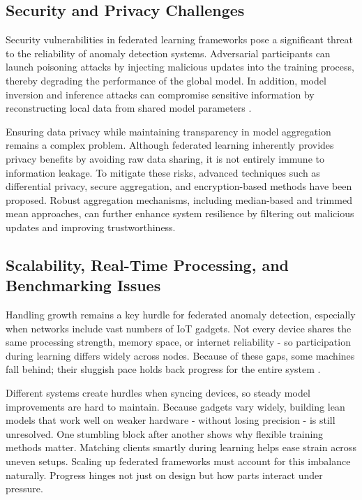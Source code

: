 \documentclass[12pt]{article}
\begin{document}
\subsection{Security and Privacy Challenges}

Security vulnerabilities in federated learning frameworks pose a significant threat to the reliability of anomaly detection systems. Adversarial participants can launch poisoning attacks by injecting malicious updates into the training process, thereby degrading the performance of the global model. In addition, model inversion and inference attacks can compromise sensitive information by reconstructing local data from shared model parameters \cite{paper5,paper6}.

Ensuring data privacy while maintaining transparency in model aggregation remains a complex problem. Although federated learning inherently provides privacy benefits by avoiding raw data sharing, it is not entirely immune to information leakage. To mitigate these risks, advanced techniques such as differential privacy, secure aggregation, and encryption-based methods have been proposed. Robust aggregation mechanisms, including median-based and trimmed mean approaches, can further enhance system resilience by filtering out malicious updates and improving trustworthiness.

\subsection{Scalability, Real-Time Processing, and Benchmarking Issues}

Handling growth remains a key hurdle for federated anomaly detection, especially when networks include vast numbers of IoT gadgets. Not every device shares the same processing strength, memory space, or internet reliability - so participation during learning differs widely across nodes. Because of these gaps, some machines fall behind; their sluggish pace holds back progress for the entire system \cite{paper7,paper8}.

Different systems create hurdles when syncing devices, so steady model improvements are hard to maintain. Because gadgets vary widely, building lean models that work well on weaker hardware - without losing precision - is still unresolved. One stumbling block after another shows why flexible training methods matter. Matching clients smartly during learning helps ease strain across uneven setups. Scaling up federated frameworks must account for this imbalance naturally. Progress hinges not just on design but how parts interact under pressure.
\end{document}
